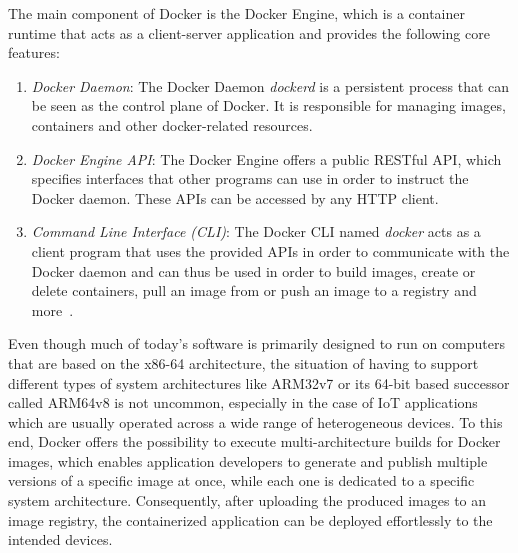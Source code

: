 The main component of Docker is the Docker Engine, which is a container runtime that acts as a client-server application and provides the following core features:

\begin{enumerate}
    \item \textit{Docker Daemon}: The Docker Daemon \textit{dockerd} is a persistent process that can be seen as the control plane of Docker. It is responsible for managing images, containers and other docker-related resources.
    \item \textit{Docker Engine API}: The Docker Engine offers a public RESTful API, which specifies interfaces that other programs can use in order to instruct the Docker daemon. These APIs can be accessed by any HTTP client.
    \item \textit{Command Line Interface (CLI)}: The Docker CLI named \textit{docker} acts as a client program that uses the provided APIs in order to communicate with the Docker daemon and can thus be used in order to build images, create or delete containers, pull an image from or push an image to a registry and more~\parencite{docker-engine}.
\end{enumerate}

Even though much of today's software is primarily designed to run on computers that are based on the x86-64 architecture, the situation of having to support different types of system architectures like ARM32v7 or its 64-bit based successor called ARM64v8 is not uncommon, especially in the case of IoT applications which are usually operated across a wide range of heterogeneous devices. To this end, Docker offers the possibility to execute multi-architecture builds for Docker images, which enables application developers to generate and publish multiple versions of a specific image at once, while each one is dedicated to a specific system architecture. Consequently, after uploading the produced images to an image registry, the containerized application can be deployed effortlessly to the intended devices.



